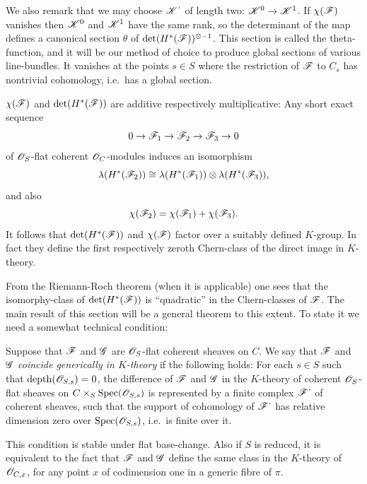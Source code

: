 \documentclass[12pt,english]{smfart}
\theoremstyle{plain} \newtheorem{innerthm}{Theorem} \newtheorem{innerlem}{Lemma} \newtheorem{innerprop}{Proposition} \newtheorem{innercor}{Corollary} \theoremstyle{definition} \newtheorem{innerdefn}{Definition} \newtheorem{innerconstr}{Construction} \theoremstyle{remark} \newtheorem*{remark}{Remark} \newtheorem*{remarks}{Remarks} \newtheorem*{applications}{Applications}
\begin{document}
We also remark that we may choose $\mathscr{K}^{\textstyle\cdot}$ of length two: $\mathscr{K}^0\to\mathscr{K}^1$. If $\chi(\mathscr{F})$ vanishes then $\mathscr{K}^0$ and $\mathscr{K}^1$ have the same rank, so the determinant of the map defines a canonical section $\theta$ of $\det(H^*(\mathscr{F}))^{\otimes-1}$. This section is called the theta-function, and it will be our method of choice to produce global sections of various line-bundles. It vanishes at the points $s\in S$ where the restriction of $\mathscr{F}$ to $C_s$ has nontrivial cohomology, i.e.\ has a global section.

$\chi(\mathscr{F})$ and $\det(H^*(\mathscr{F}))$ are additive respectively multiplicative: Any short exact sequence
\[
0\to\mathscr{F}_1\to\mathscr{F}_2\to\mathscr{F}_3\to 0
\]
of $\mathscr{O}_S$-flat coherent $\mathscr{O}_C$-modules induces an isomorphism
\[
\lambda(H^*(\mathscr{F}_2))\cong\lambda(H^*(\mathscr{F}_1))\otimes\lambda(H^*(\mathscr{F}_3)),
\]
and also
\[
\chi(\mathscr{F}_2)=\chi(\mathscr{F}_1)+\chi(\mathscr{F}_3).
\]
It follows that $\det(H^*(\mathscr{F}))$ and $\chi(\mathscr{F})$ factor over a suitably defined $K$-group. In fact they define the first respectively zeroth Chern-class of the direct image in $K$-theory.

From the Riemann-Roch theorem (when it is applicable) one sees that the isomorphy-class of $\det(H^*(\mathscr{F}))$ is ``quadratic'' in the Chern-classes of $\mathscr{F}$. The main result of this section will be a general theorem to this extent. To state it we need a somewhat technical condition:

Suppose that $\mathscr{F}$ and $\mathscr{G}$ are $\mathscr{O}_S$-flat coherent sheaves on $C$. We say that $\mathscr{F}$ and $\mathscr{G}$ \emph{coincide generically in $K$-theory} if the following holds: For each $s\in S$ such that $\operatorname{depth}(\mathscr{O}_{S,s})=0$, the difference of $\mathscr{F}$ and $\mathscr{G}$ in the $K$-theory of coherent $\mathscr{O}_S$-flat sheaves on $C\times_S\operatorname{Spec}(\mathscr{O}_{S,s})$ is represented by a finite complex $\mathscr{F}^{\textstyle\cdot}$ of coherent sheaves, such that the support of cohomology of $\mathscr{F}^{\textstyle\cdot}$ has relative dimension zero over $\operatorname{Spec}(\mathscr{O}_{S,s})$, i.e.\ is finite over it.

This condition is stable under flat base-change. Also if $S$ is reduced, it is equivalent to the fact that $\mathscr{F}$ and $\mathscr{G}$ define the same class in the $K$-theory of $\mathscr{O}_{C,x}$, for any point $x$ of codimension one in a generic fibre of $\pi$.
\end{document}
